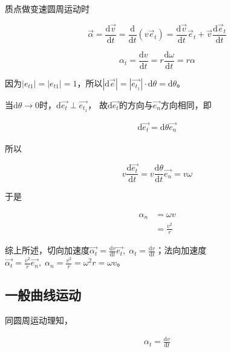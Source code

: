 \documentclass[
	12pt, %
	fleqn, %
	a4paper, %
]{myLegrandOrangeBook}
\newcommand{\rmd}{\mathrm{d}}
\newcommand{\deriv}[2]{\frac{\rmd #1}{\rmd #2}}
\begin{document}
    质点做变速圆周运动时

    \begin{equation}
        \overrightarrow{\alpha}=\deriv{\overrightarrow{v}}{t}=
        \frac{\rmd}{\rmd t}\left(v \overrightarrow{e}_t\right)=\deriv{\overrightarrow{v}}{t}
        \overrightarrow{e}_t+\overrightarrow{v} \deriv{\overrightarrow{e}_t}{t}
    \end{equation}

    \begin{equation}
        \alpha_{t} = \deriv{v}{t} = r \deriv{\omega}{t} = r \alpha
    \end{equation}

    因为\(\left|e_{t1}\right| = \left|e_{t1}\right| =1\)，所以\(\left|\rmd \overrightarrow{e}\right|
    = \left|\overrightarrow{e_{t_1}}\right| \cdot \rmd \theta = \rmd \theta\)。

    当\(\rmd \theta \rightarrow 0\)时，\(\rmd \overrightarrow{e_{t}} \perp \overrightarrow{e_{t_1}}\)，
    故\(\rmd \overrightarrow{e_{t}}\)的方向与\(\overrightarrow{e_{n}}\)方向相同，即

    \begin{align}
        \rmd \overrightarrow{e_{t}} = \rmd \theta \overrightarrow{e_n}
    \end{align}

    所以

    \[
        v \deriv{\overrightarrow{e_t}}{t} = v \deriv{\theta}{t} \overrightarrow{e_{n}} = v \omega
    \]

    于是

    \begin{align}
        \alpha_n &= \omega v \\
        &= \frac{v^2}{r}
    \end{align}

    综上所述，切向加速度\(\overrightarrow{\alpha_t} = \deriv{v}{t} \overrightarrow{e_t}, \;
    \alpha_t = \deriv{v}{t}\)；法向加速度\(\overrightarrow{\alpha_t} = \frac{v^2}{r} \overrightarrow{e_n},
    \; \alpha_n = \frac{v^2}{r} = \omega^2r = \omega v\)。

\subsection{一般曲线运动}

    同圆周运动理知，

    \begin{align}
        \alpha_t = \deriv{v}{t}
    \end{align}
\end{document}
